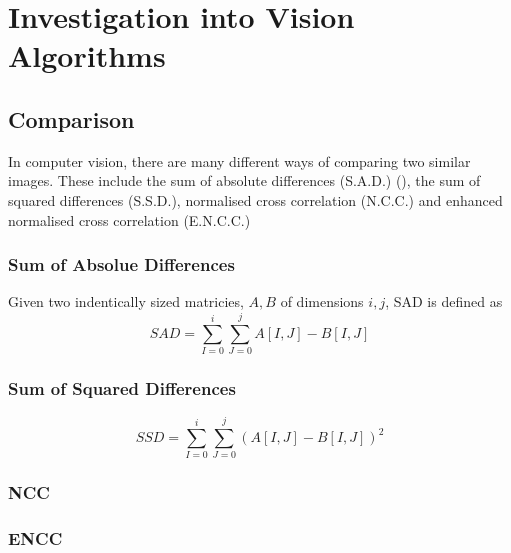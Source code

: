 \chapter{Investigation into Vision Algorithms} \label{Chapter:InvestigationVision}

\section{Comparison}
In computer vision, there are many different ways of comparing two similar images. These include the sum of absolute differences (S.A.D.) (\cite{Hamzah:DistanceDetection}), the sum of squared differences (S.S.D.), normalised cross correlation (N.C.C.) and enhanced normalised cross correlation (E.N.C.C.)

\subsection{Sum of Absolue Differences}

Given two indentically sized matricies, $A, B$ of dimensions $i,j$, SAD is defined as
\begin{equation}
SAD = \sum\limits_{I=0}^i \sum\limits_{J=0}^j A[I,J] - B[I,J] 
\end{equation}

\subsection{Sum of Squared Differences}
\begin{equation}
SSD = \sum\limits_{I=0}^i \sum\limits_{J=0}^j (A[I,J] - B[I,J] )^2
\end{equation}

\subsection{NCC}
\subsection{ENCC}
